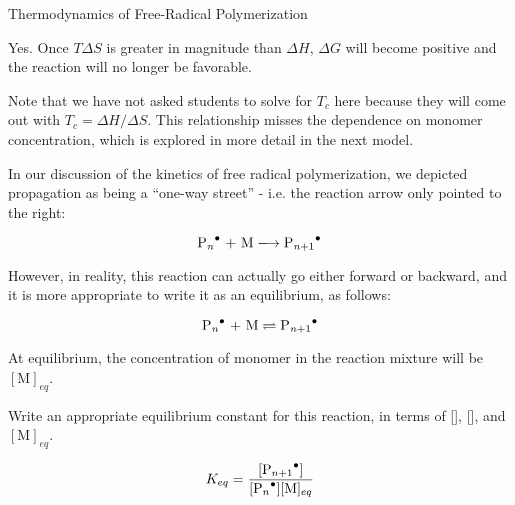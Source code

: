\begin{activity}{Thermodynamics of Free-Radical Polymerization}
\begin{ctqs}
		\begin{solution}[1.25in]{}
			Yes.  Once $T\Delta S$ is greater in magnitude than $\Delta H$, $\Delta G$ will become positive and the reaction will no longer be favorable.
			
			Note that we have not asked students to solve for $T_c$ here because they will come out with $T_c = \Delta H/\Delta S$.  This relationship misses the dependence on monomer concentration, which is explored in more detail in the next model.
		\end{solution}

\end{ctqs}




\begin{model}
	\label{\labelbase:mdl:propequilib}

	In our discussion of the kinetics of free radical polymerization, we depicted propagation as being a ``one-way street'' - i.e. the reaction arrow only pointed to the right:
	
	\begin{equation*}
		\text{\ce{P_n^.} + M} \xlongrightarrow{} \text{\ce{P_{n+1}^.}}
	\end{equation*}
	
	However, in reality, this reaction can actually go either forward or backward, and it is more appropriate to write it as an equilibrium, as follows:
	
	\begin{equation*}
		\text{\ce{P_n^.} + M} \rightleftharpoons{} \text{\ce{P_{n+1}^.}}
	\end{equation*}
	
	At equilibrium, the concentration of monomer in the reaction mixture will be $[\text{M}]_{eq}$.
	
\end{model}


\begin{ctqs}

	\question Write an appropriate equilibrium constant for this reaction, in terms of [], [], and $[\text{M}]_{eq}$.
				
				\begin{solution}[1in]{}
					\begin{equation*}
						K_{eq} = \frac{[\ce{P_{n+1}^.}]}{[\ce{P_n^.}][\text{M}]_{eq}}
					\end{equation*}
				\end{solution}
	

\end{ctqs}
\end{activity}
